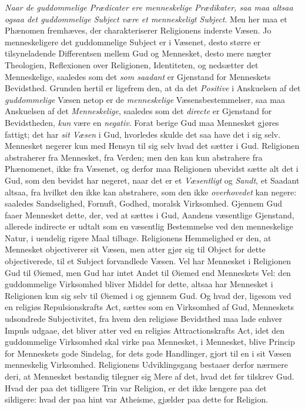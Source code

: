 \emph{Naar de guddommelige Prædicater ere menneskelige Prædikater, saa maa
altsaa ogsaa det guddommelige Subject være et menneskeligt Subject}. Men her
maa et Phænomen fremhæves, der charakteriserer Religionens inderste Væsen. Jo
menneskeligere det guddommelige Subject er i Væsenet, desto større er
tilsyneladende Differentsen mellem Gud og Mennesket, desto mere nægter
Theologien, Reflexionen over Religionen, Identiteten, og nedsætter det
Menneskelige, saaledes som det \emph{som saadant} er Gjenstand for Menneskets
Bevidsthed. Grunden
 hertil er ligefrem den, at da det \emph{Positive} i Anskuelsen af det
\emph{guddommelige} Væsen netop er de \emph{menneskelige} Væsensbestemmelser, saa maa
Anskuelsen af det \emph{Menneskelige}, saaledes som det \emph{directe} er Gjenstand for
Bevidstheden, \emph{kun} være en \emph{negativ}.
Forat berige Gud maa Mennesket gjøres fattigt; det har \emph{sit Væsen} i Gud,
hvorledes skulde det saa have det i sig selv. Mennesket negerer kun med Hensyn
til sig selv hvad det sætter i Gud. Religionen abstraherer fra Mennesket, fra
Verden; men den kan kun abstrahere fra Phænomenet, ikke fra Væsenet, og derfor
maa Religionen ubevidst sætte alt det i Gud, som den bevidst har negeret, naar
det er et \emph{Væsentligt} og \emph{Sandt}, et Saadant altsaa, fra hvilket den ikke
kan abstrahere, som den ikke \emph{overhovedet} kan negere: saaledes Sandselighed,
Fornuft, Godhed, moralsk Virksomhed.
Gjennem Gud faaer Mennesket dette, der, ved at sættes i Gud, Aandens væsentlige
Gjenstand, allerede indirecte er udtalt som en væsentlig Bestemmelse ved den
menneskelige Natur, i uendelig rigere Maal tilbage. Religionens Hemmelighed er
den, at Mennesket objectiverer sit Væsen, men atter gjør sig til Object for
dette objectiverede, til et Subject forvandlede Væsen. Vel har Mennesket i
Religionen Gud til Øiemed, men Gud har intet Andet til Øiemed end Menneskets
Vel: den guddommelige Virksomhed bliver Middel for dette, altsaa har Mennesket
i Religionen kun sig selv til Øiemed i og gjennem Gud. Og hvad der, ligesom ved
en religiøs Repulsionskrafts Act, sættes som en Virksomhed af Gud, Menneskets
udsondrede Subjectivitet, fra hvem den religiøse Bevidsthed maa lade enhver
Impuls udgaae, det bliver atter ved en religiøs Attractionskrafts Act, idet den
guddommelige Virksomhed skal virke paa Mennesket, i Mennesket, blive Princip
for Menneskets gode Sindelag, for dets gode Handlinger, gjort til en i sit
Væsen menneskelig Virksomhed. Religionens Udviklingsgang bestaaer derfor
nærmere deri, at Mennesket bestandig tilegner sig Mere af det, hvad det før
tilskrev Gud. Hvad der paa det tidligere Trin var
 Religion, er det ikke længere paa det sildigere: hvad der paa hint var
Atheisme, gjælder paa dette for Religion.

